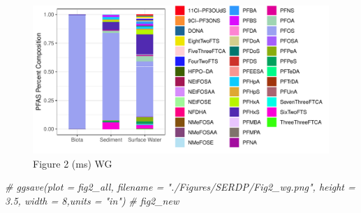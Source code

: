 \documentclass[
]{article}
\newenvironment{Shaded}{\begin{snugshade}}{\end{snugshade}}
\newcommand{\CommentTok}[1]{\textcolor[rgb]{0.56,0.35,0.01}{\textit{#1}}}
\begin{document}
\begin{figure}

{\centering \includegraphics{CompleteDatasets_rerun_files/figure-latex/Figure 2 WG-1} 

}

\caption{Figure 2 (ms) WG}\label{fig:Figure 2 WG}
\end{figure}

\begin{Shaded}
\begin{Highlighting}[]
\CommentTok{\# ggsave(plot = fig2\_all, filename = "./Figures/SERDP/Fig2\_wg.png", height = 3.5, width = 8,units = "in")}
\CommentTok{\# fig2\_new}
\end{Highlighting}
\end{Shaded}
\end{document}
